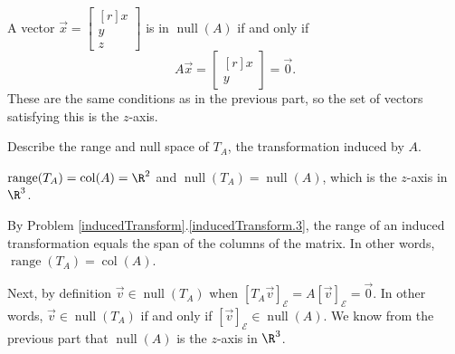 \documentclass{problemset}
\DeclareMathOperator{\Range}{range}
\DeclareMathOperator{\Null}{null}
\DeclareMathOperator{\Col}{col}
\newcommand{\mat}[1]{\begin{bmatrix*}[r]#1\end{bmatrix*}}
\begin{document}
\begin{parts}
\begin{solution}
				A vector $\vec x=\mat{x\\y\\z}$ is in $\Null(A)$ if
				and only if
				\[
					A\vec x = \mat{x\\y} = \vec 0.
				\]
				These are the same conditions as in the previous part, so the set
				of vectors satisfying this is the $z$-axis.
			\end{solution}
		\item Describe the range and null space of $T_A$, the transformation
			induced by $A$.
			\label{fundamentalSubspaces.6}
			\begin{solution}
				$\Range(T_A)=\Col(A)=\R^2$ and $\Null(T_A)=\Null(A)$,
				which is the $z$-axis in $\R^3$.

				By Problem \ref{inducedTransform}.\ref{inducedTransform.3}, the
				range of an induced transformation equals the span of the columns
				of the matrix. In other words, $\Range(T_A)=\Col(A)$.

				Next, by definition $\vec v\in\Null(T_A)$ when
				$[T_A\vec v]_{\mathcal E}=A[\vec v]_{\mathcal E}=\vec 0$.
				In other words, $\vec v\in\Null(T_A)$ if and only if
				$[\vec v]_{\mathcal E}\in\Null(A)$. We know from the previous
				part that $\Null(A)$ is the $z$-axis in $\R^3$.
			\end{solution}
	\end{parts}
\end{document}
